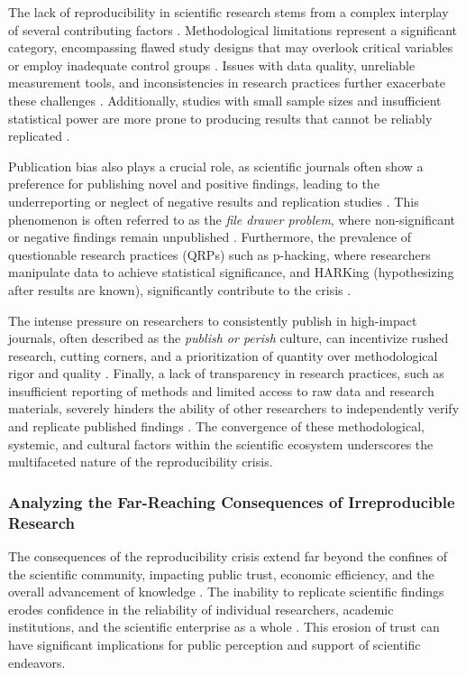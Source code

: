 \documentclass{article}
\begin{document}
The lack of reproducibility in scientific research stems from a complex interplay of several contributing factors \cite{ioannidis2005most}. Methodological limitations represent a significant category, encompassing flawed study designs that may overlook critical variables or employ inadequate control groups \cite{ioannidis2005most}. Issues with data quality, unreliable measurement tools, and inconsistencies in research practices further exacerbate these challenges \cite{ioannidis2005most}. Additionally, studies with small sample sizes and insufficient statistical power are more prone to producing results that cannot be reliably replicated \cite{baker2016reproducibility}.

Publication bias also plays a crucial role, as scientific journals often show a preference for publishing novel and positive findings, leading to the underreporting or neglect of negative results and replication studies \cite{franco2014publication}. This phenomenon is often referred to as the \textit{file drawer problem}, where non-significant or negative findings remain unpublished \cite{simmons2011false}. Furthermore, the prevalence of questionable research practices (QRPs) such as p-hacking, where researchers manipulate data to achieve statistical significance, and HARKing (hypothesizing after results are known), significantly contribute to the crisis \cite{simmons2011false}.

The intense pressure on researchers to consistently publish in high-impact journals, often described as the \textit{publish or perish} culture, can incentivize rushed research, cutting corners, and a prioritization of quantity over methodological rigor and quality \cite{fanelli2010positive}. Finally, a lack of transparency in research practices, such as insufficient reporting of methods and limited access to raw data and research materials, severely hinders the ability of other researchers to independently verify and replicate published findings \cite{franco2014publication}. The convergence of these methodological, systemic, and cultural factors within the scientific ecosystem underscores the multifaceted nature of the reproducibility crisis.

\subsubsection{Analyzing the Far-Reaching Consequences of Irreproducible Research}

The consequences of the reproducibility crisis extend far beyond the confines of the scientific community, impacting public trust, economic efficiency, and the overall advancement of knowledge \cite{baker2016reproducibility}. The inability to replicate scientific findings erodes confidence in the reliability of individual researchers, academic institutions, and the scientific enterprise as a whole \cite{baker2016reproducibility}. This erosion of trust can have significant implications for public perception and support of scientific endeavors.
\end{document}
